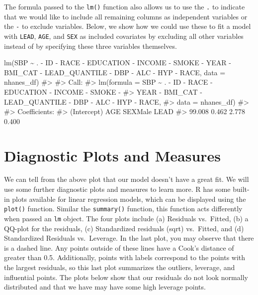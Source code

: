 \documentclass[
  letterpaper,
]{krantz}
\makeatletter
\newenvironment{Shaded}{\begin{snugshade}}{\end{snugshade}}
\newcommand{\AttributeTok}[1]{\textcolor[rgb]{0.40,0.45,0.13}{#1}}
\newcommand{\CommentTok}[1]{\textcolor[rgb]{0.37,0.37,0.37}{#1}}
\newcommand{\FunctionTok}[1]{\textcolor[rgb]{0.28,0.35,0.67}{#1}}
\newcommand{\NormalTok}[1]{\textcolor[rgb]{0.00,0.23,0.31}{#1}}
\newcommand{\SpecialCharTok}[1]{\textcolor[rgb]{0.37,0.37,0.37}{#1}}
\newenvironment{kframe}{%
\medskip{}
\setlength{\fboxsep}{.8em}
 \def\at@end@of@kframe{}%
 \ifinner\ifhmode%
  \def\at@end@of@kframe{\end{minipage}}%
  \begin{minipage}{\columnwidth}%
 \fi\fi%
 \def\FrameCommand##1{\hskip\@totalleftmargin \hskip-\fboxsep
 \colorbox{shadecolor}{##1}\hskip-\fboxsep
     \hskip-\linewidth \hskip-\@totalleftmargin \hskip\columnwidth}%
 \MakeFramed {\advance\hsize-\width
   \@totalleftmargin\z@ \linewidth\hsize
   \@setminipage}}%
 {\par\unskip\endMakeFramed%
 \at@end@of@kframe}
\renewenvironment{Shaded}{\begin{kframe}}{\end{kframe}}
\makeatother
\begin{document}
The formula passed to the \texttt{lm()} function also allows us to use
the \texttt{.} to indicate that we would like to include all remaining
columns as independent variables or the \texttt{-} to exclude variables.
Below, we show how we could use these to fit a model with \texttt{LEAD},
\texttt{AGE}, and \texttt{SEX} as included covariates by excluding all
other variables instead of by specifying these three variables
themselves.

\begin{Shaded}
\begin{Highlighting}[]
\FunctionTok{lm}\NormalTok{(SBP }\SpecialCharTok{\textasciitilde{}}\NormalTok{ . }\SpecialCharTok{{-}}\NormalTok{ ID }\SpecialCharTok{{-}}\NormalTok{ RACE }\SpecialCharTok{{-}}\NormalTok{ EDUCATION }\SpecialCharTok{{-}}\NormalTok{ INCOME }\SpecialCharTok{{-}}\NormalTok{ SMOKE }\SpecialCharTok{{-}}\NormalTok{ YEAR }\SpecialCharTok{{-}}\NormalTok{ BMI\_CAT }\SpecialCharTok{{-}} 
\NormalTok{   LEAD\_QUANTILE }\SpecialCharTok{{-}}\NormalTok{ DBP }\SpecialCharTok{{-}}\NormalTok{ ALC }\SpecialCharTok{{-}}\NormalTok{ HYP }\SpecialCharTok{{-}}\NormalTok{ RACE, }\AttributeTok{data =}\NormalTok{ nhanes\_df)}
\CommentTok{\#\textgreater{} }
\CommentTok{\#\textgreater{} Call:}
\CommentTok{\#\textgreater{} lm(formula = SBP \textasciitilde{} . {-} ID {-} RACE {-} EDUCATION {-} INCOME {-} SMOKE {-} }
\CommentTok{\#\textgreater{}     YEAR {-} BMI\_CAT {-} LEAD\_QUANTILE {-} DBP {-} ALC {-} HYP {-} RACE, }
\CommentTok{\#\textgreater{}     data = nhanes\_df)}
\CommentTok{\#\textgreater{} }
\CommentTok{\#\textgreater{} Coefficients:}
\CommentTok{\#\textgreater{} (Intercept)          AGE      SEXMale         LEAD  }
\CommentTok{\#\textgreater{}      99.008        0.462        2.778        0.400}
\end{Highlighting}
\end{Shaded}

\hypertarget{diagnostic-plots-and-measures}{%
\section{Diagnostic Plots and
Measures}\label{diagnostic-plots-and-measures}}

We can tell from the above plot that our model doesn't have a great fit.
We will use some further diagnostic plots and measures to learn more. R
has some built-in plots available for linear regression models, which
can be displayed using the \texttt{plot()} function. Similar the
\texttt{summary()} function, this function acts differently when passed
an \texttt{lm} object. The four plots include (a) Residuals vs.~Fitted,
(b) a QQ-plot for the residuals, (c) Standardized residuals (sqrt)
vs.~Fitted, and (d) Standardized Residuals vs.~Leverage. In the last
plot, you may observe that there is a dashed line. Any points outside of
these lines have a Cook's distance of greater than 0.5. Additionally,
points with labels correspond to the points with the largest residuals,
so this last plot summarizes the outliers, leverage, and influential
points. The plots below show that our residuals do not look normally
distributed and that we have may have some high leverage points.
\end{document}
